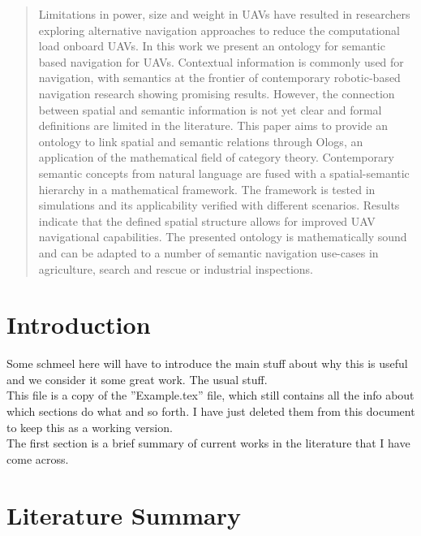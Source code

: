\documentclass[twocolumn,letterpaper]{IEEEAerospaceCLS}  %
\begin{document}
\begin{abstract}
Limitations in power, size and weight in UAVs have resulted in researchers exploring alternative navigation approaches to reduce the computational load onboard UAVs. In this work we present an ontology for semantic based navigation for UAVs. Contextual information is commonly used for navigation, with semantics at the frontier of contemporary robotic-based navigation research showing promising results. However, the connection between spatial and semantic information is not yet clear and formal definitions are limited in the literature. This paper aims to provide an ontology to link spatial and semantic relations through Ologs, an application of the mathematical field of category theory. Contemporary semantic concepts from natural language are fused with a spatial-semantic hierarchy in a mathematical framework. The framework is tested in simulations and its applicability verified with different scenarios. Results indicate that the defined spatial structure allows for improved UAV navigational capabilities. The presented ontology is mathematically sound and can be adapted to a number of semantic navigation use-cases in agriculture, search and rescue or industrial inspections.
\end{abstract} 


\tableofcontents

\section{Introduction} \label{sec:Intro}
Some schmeel here will have to introduce the main stuff about why this is useful and we consider it some great work. The usual stuff.\\
This file is a copy of the ''Example.tex'' file, which still contains all the info about which sections do what and so forth. I have just deleted them from this document to keep this as a working version.\\
The first section is a brief summary of current works in the literature that I have come across.~\cite{alirezaie_exploiting_2017}

\section{Literature Summary} \label{sec:Lit}


\appendices{}              %
\end{document}
